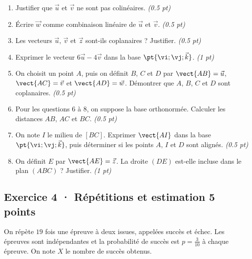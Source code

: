 \begin{enumerate}

\item Justifier que $\vec u$ et $\vec v$ ne sont pas colinéaires. \hfill\textit{(\num{0,5} pt)}

\item Écrire $\vec w$ comme combinaison linéaire de $\vec u$ et $\vec v$. \hfill\textit{(\num{0,5} pt)}

\item Les vecteurs $\vec u$, $\vec v$ et $\vec z$ sont-ils coplanaires ? Justifier. \hfill\textit{(\num{0,5} pt)}

\item Exprimer le vecteur $6\vec u-4\vec v$ dans la base $\pt{\vi;\vj;\vec k}$. \hfill\textit{(1 pt)}

\item On choisit un point $A$, puis on définit $B$, $C$ et $D$ par $\vect{AB}=\vec u$, $\vect{AC}=\vec v$ et $\vect{AD}=\vec w$. Démontrer que $A$, $B$, $C$ et $D$ sont coplanaires. \hfill\textit{(\num{0,5} pt)}

\item Pour les questions 6 à 8, on suppose la base orthonormée. Calculer les distances $AB$, $AC$ et $BC$. \hfill\textit{(\num{0,5} pt)}

\item On note $I$ le milieu de $[BC]$. Exprimer $\vect{AI}$ dans la base $\pt{\vi;\vj;\vec k}$, puis déterminer si les points $A$, $I$ et $D$ sont alignés. \hfill\textit{(\num{0,5} pt)}

\item On définit $E$ par $\vect{AE}=\vec z$. La droite $(DE)$ est-elle incluse dans le plan $(ABC)$ ? Justifier. \hfill\textit{(1 pt)}

\end{enumerate}

\subsection*{Exercice 4 · Répétitions et estimation \hfill 5 points}On répète $19$ fois une épreuve à deux issues, appelées succès et échec. Les épreuves sont indépendantes et la probabilité de succès est $p=\frac{3}{10}$ à chaque épreuve. On note $X$ le nombre de succès obtenus.

